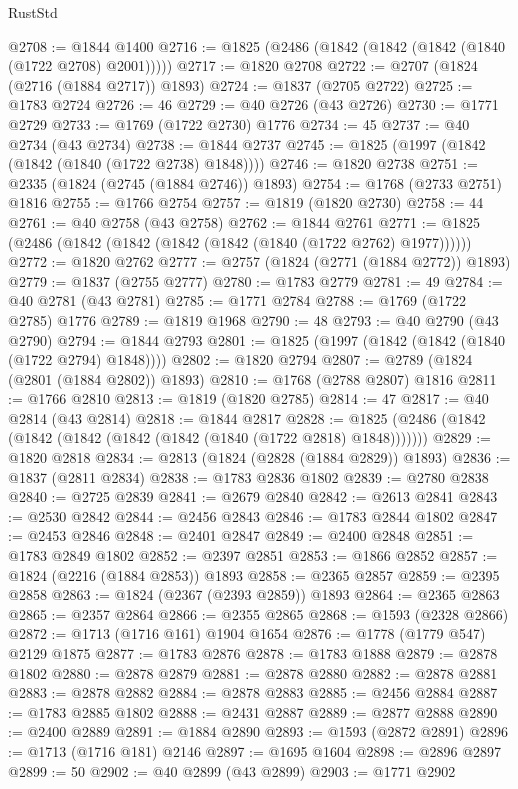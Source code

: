 \begin{lexlean}{RustStd}
\begin{coremodule}
@2708 := @1844 @1400
@2716 := @1825 (@2486 (@1842 (@1842 (@1842 (@1840 (@1722 @2708) @2001)))))
@2717 := @1820 @2708
@2722 := @2707 (@1824 (@2716 (@1884 @2717)) @1893)
@2724 := @1837 (@2705 @2722)
@2725 := @1783 @2724
@2726 := 46
@2729 := @40 @2726 (@43 @2726)
@2730 := @1771 @2729
@2733 := @1769 (@1722 @2730) @1776
@2734 := 45
@2737 := @40 @2734 (@43 @2734)
@2738 := @1844 @2737
@2745 := @1825 (@1997 (@1842 (@1842 (@1840 (@1722 @2738) @1848))))
@2746 := @1820 @2738
@2751 := @2335 (@1824 (@2745 (@1884 @2746)) @1893)
@2754 := @1768 (@2733 @2751) @1816
@2755 := @1766 @2754
@2757 := @1819 (@1820 @2730)
@2758 := 44
@2761 := @40 @2758 (@43 @2758)
@2762 := @1844 @2761
@2771 := @1825 (@2486 (@1842 (@1842 (@1842 (@1842 (@1840 (@1722 @2762) @1977))))))
@2772 := @1820 @2762
@2777 := @2757 (@1824 (@2771 (@1884 @2772)) @1893)
@2779 := @1837 (@2755 @2777)
@2780 := @1783 @2779
@2781 := 49
@2784 := @40 @2781 (@43 @2781)
@2785 := @1771 @2784
@2788 := @1769 (@1722 @2785) @1776
@2789 := @1819 @1968
@2790 := 48
@2793 := @40 @2790 (@43 @2790)
@2794 := @1844 @2793
@2801 := @1825 (@1997 (@1842 (@1842 (@1840 (@1722 @2794) @1848))))
@2802 := @1820 @2794
@2807 := @2789 (@1824 (@2801 (@1884 @2802)) @1893)
@2810 := @1768 (@2788 @2807) @1816
@2811 := @1766 @2810
@2813 := @1819 (@1820 @2785)
@2814 := 47
@2817 := @40 @2814 (@43 @2814)
@2818 := @1844 @2817
@2828 := @1825 (@2486 (@1842 (@1842 (@1842 (@1842 (@1842 (@1840 (@1722 @2818) @1848)))))))
@2829 := @1820 @2818
@2834 := @2813 (@1824 (@2828 (@1884 @2829)) @1893)
@2836 := @1837 (@2811 @2834)
@2838 := @1783 @2836 @1802
@2839 := @2780 @2838
@2840 := @2725 @2839
@2841 := @2679 @2840
@2842 := @2613 @2841
@2843 := @2530 @2842
@2844 := @2456 @2843
@2846 := @1783 @2844 @1802
@2847 := @2453 @2846
@2848 := @2401 @2847
@2849 := @2400 @2848
@2851 := @1783 @2849 @1802
@2852 := @2397 @2851
@2853 := @1866 @2852
@2857 := @1824 (@2216 (@1884 @2853)) @1893
@2858 := @2365 @2857
@2859 := @2395 @2858
@2863 := @1824 (@2367 (@2393 @2859)) @1893
@2864 := @2365 @2863
@2865 := @2357 @2864
@2866 := @2355 @2865
@2868 := @1593 (@2328 @2866)
@2872 := @1713 (@1716 @161) @1904 @1654
@2876 := @1778 (@1779 @547) @2129 @1875
@2877 := @1783 @2876
@2878 := @1783 @1888
@2879 := @2878 @1802
@2880 := @2878 @2879
@2881 := @2878 @2880
@2882 := @2878 @2881
@2883 := @2878 @2882
@2884 := @2878 @2883
@2885 := @2456 @2884
@2887 := @1783 @2885 @1802
@2888 := @2431 @2887
@2889 := @2877 @2888
@2890 := @2400 @2889
@2891 := @1884 @2890
@2893 := @1593 (@2872 @2891)
@2896 := @1713 (@1716 @181) @2146
@2897 := @1695 @1604
@2898 := @2896 @2897
@2899 := 50
@2902 := @40 @2899 (@43 @2899)
@2903 := @1771 @2902

\end{coremodule}
\end{lexlean}
